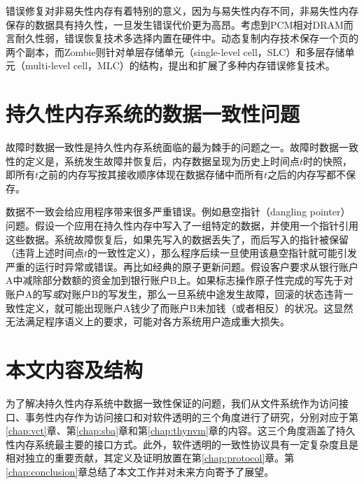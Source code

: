 错误修复对非易失性内存有着特别的意义，因为与易失性内存不同，非易失性内存保存的数据具有持久性，一旦发生错误代价更为高昂。考虑到PCM相对DRAM而言耐久性弱，错误恢复技术多选择内置在硬件中。动态复制内存技术\cite{Ipek:2010:DRM:1736020.1736023}保存一个页的两个副本，而Zombie\cite{Azevedo:2013:ZME:2485922.2485961}则针对单层存储单元（single-level cell，SLC）和多层存储单元（multi-level cell，MLC）的结构，提出和扩展了多种内存错误修复技术。

\section{持久性内存系统的数据一致性问题}
\label{intro:crash-consistency}

故障时数据一致性是持久性内存系统面临的最为棘手的问题之一\cite{Onur:2014:RPO}。故障时数据一致性的定义是，系统发生故障并恢复后，内存数据呈现为历史上时间点$t$时的快照，即所有$t$之前的内存写按其接收顺序体现在数据存储中而所有$t$之后的内存写都不保存。

数据不一致会给应用程序带来很多严重错误。例如悬空指针（dangling pointer）问题\cite{Volos:2011:MLP:1950365.1950379,Coburn:2011:NMP:1950365.1950380}。假设一个应用在持久性内存中写入了一组特定的数据，并使用一个指针引用这些数据。系统故障恢复后，如果先写入的数据丢失了，而后写入的指针被保留（违背上述时间点$t$的一致性定义），那么程序后续一旦使用该悬空指针就可能引发严重的运行时异常或错误。再比如经典的原子更新问题。假设客户要求从银行账户A中减除部分数额的资金加到银行账户B上。如果标志操作原子性完成的写先于对账户A的写\emph{或}对账户B的写发生，那么一旦系统中途发生故障，回滚的状态违背一致性定义，就可能出现账户A钱少了而账户B未加钱（或者相反）的状况。这显然无法满足程序语义上的要求，可能对各方系统用户造成重大损失。

\section{本文内容及结构}

为了解决持久性内存系统中数据一致性保证的问题，我们从文件系统作为访问接口、事务性内存作为访问接口和对软件透明的三个角度进行了研究，分别对应于第\ref{chap:vct}章、第\ref{chap:sba}章和第\ref{chap:thynvm}章的内容。这三个角度涵盖了持久性内存系统最主要的接口方式。此外，软件透明的一致性协议具有一定复杂度且是相对独立的重要贡献，其定义及证明放置在第\ref{chap:protocol}章。第\ref{chap:conclusion}章总结了本文工作并对未来方向寄予了展望。

